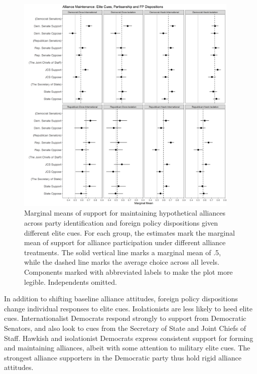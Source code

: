 \documentclass[12pt]{article}
\begin{document}
\begin{figure}
	\centering
		\includegraphics[width=0.95\textwidth]{../figures/party-dispo-main-el.png}
	\caption{Marginal means of support for maintaining hypothetical alliances across party identification and foreign policy dispositions given different elite cues. For each group, the estimates mark the marginal mean of support for alliance participation under different alliance treatments. The solid vertical line marks a marginal mean of .5, while the dashed line marks the average choice across all levels. Components marked with abbreviated labels to make the plot more legible. Independents omitted.}
	\label{fig:party-dispo-main-el}
\end{figure}


In addition to shifting baseline alliance attitudes, foreign policy dispositions change individual responses to elite cues. 
Isolationists are less likely to heed elite cues. 
Internationalist Democrats respond strongly to support from Democratic Senators, and also look to cues from the Secretary of State and Joint Chiefs of Staff. 
Hawkish and isolationist Democrats express consistent support for forming and maintaining alliances, albeit with some attention to military elite cues. 
The strongest alliance supporters in the Democratic party thus hold rigid alliance attitudes.
\end{document}
